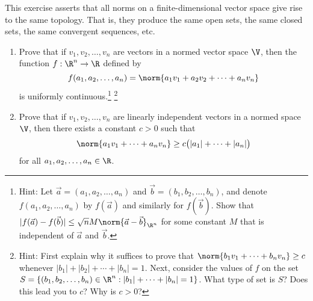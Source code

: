 \documentclass{homework}
\date{Thursday 2/7}
\author{}
\begin{document}
\begin{Exercise}
	This exercise asserts that all norms on a finite-dimensional vector
  space give rise to the same topology.  That is, they produce the
  same open sets, the same closed sets, the same convergent sequences,
  etc.
	\begin{enumerate}
  \item Prove that if $v_1,v_2,\ldots, v_n$ are vectors in a normed
    vector space $\V$, then the function $f: \R^n \rightarrow \R$
    defined by
    \begin{equation*}
      f(a_1,a_2, \ldots, a_n) = \norm{ a_1 v_1 + a_2 v_2 + \cdots + a_n v_n}
    \end{equation*}
    is uniformly continuous.\footnote{Hint: Let
      $\vec{a} = (a_1,a_2,\ldots,a_n)$ and
      $\vec{b} =(b_1,b_2,\ldots,b_n)$, and denote
      $f(a_1,a_2, \ldots, a_n)$ by $f(\vec{a})$ and similarly for
      $f(\vec{b})$.  Show that
      $|f(\vec{a} ) - f(\vec{b})| \leq \sqrt{n}M \norm{ \vec{a} -
        \vec{b} }_{\R^n}$ for some constant $M$ that is independent
      of $\vec{a}$ and $\vec{b}$.}  \footnote{Hint: First explain
      why it suffices to prove that
      $\norm{b_1 v_1 + \cdots + b_n v_n } \geq c$ whenever
      $|b_1| + |b_2|+ \cdots + |b_n| = 1$.  Next, consider the
      values of $f$ on the set
      $S = \{ (b_1,b_2,\ldots,b_n) \in \R^n: |b_1| + \cdots + |b_n|
      = 1 \}$.  What type of set is $S$?  Does this lead you to $c$?
      Why is $c > 0$?}

    \begin{solution}
    \end{solution}

  \item Prove that if $v_1,v_2,\ldots, v_n$ are linearly independent
    vectors in a normed space $\V$, then there exists a constant
    $c > 0$ such that
    \begin{equation*}
      \norm{a_1 v_1 + \cdots + a_n v_n } \geq c\big( |a_1| + \cdots + |a_n| \big)
    \end{equation*}
    for all $a_1,a_2,\ldots, a_n \in \R$.

    \begin{solution}
    \end{solution}


\end{enumerate}
\end{Exercise}
\end{document}
